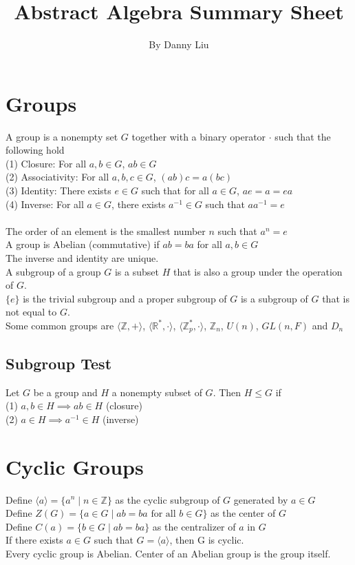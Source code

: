 \documentclass{article}
\title{Abstract Algebra Summary Sheet}
\author{By Danny Liu}
\date{}
\begin{document}
\maketitle

\section{Groups}
A group is a nonempty set $G$ together with a binary operator $\cdot$ such that the following hold \\
(1) Closure: For all $a, b \in G$, $ab \in G$ \\
(2) Associativity: For all $a, b, c \in G$, $(ab)c = a(bc)$ \\
(3) Identity: There exists $e \in G$ such that for all $a \in G$, $ae = a = ea$ \\
(4) Inverse: For all $a \in G$, there exists $a^{-1} \in G$ such that $aa^{-1} = e$ \\ \\
The order of an element is the smallest number $n$ such that $a^n = e$ \\
A group is Abelian (commutative) if $ab = ba$ for all $a, b \in G$ \\
The inverse and identity are unique. \\
A subgroup of a group $G$ is a subset $H$ that is also a group under the operation of $G$. \\
$\{e\}$ is the trivial subgroup and a proper subgroup of $G$ is a subgroup of $G$ that is not equal to $G$. \\
Some common groups are $\langle \mathbb{Z}, +\rangle$, $\langle \mathbb{R^*}, \cdot \rangle$, $\langle \mathbb{Z}_p^*, \cdot \rangle$, $\mathbb{Z}_n$, $U(n)$, $GL(n, F)$ and $D_n$
\subsection{Subgroup Test}
Let $G$ be a group and $H$ a nonempty subset of $G$. Then $H \leq G$ if \\
(1) $a, b \in H \implies ab \in H$ (closure) \\
(2) $a \in H \implies a^{-1} \in H$ (inverse) 


\section{Cyclic Groups}
Define $\langle a\rangle = \{a^{n} \mid n \in \mathbb{Z}\}$ as the cyclic subgroup of $G$ generated by $a \in G$ \\
Define $Z(G) = \{a \in G \mid ab = ba \text{ for all } b \in G\}$ as the center of $G$ \\
Define $C(a) = \{b \in G \mid ab = ba\}$ as the centralizer of $a$ in $G$ \\
If there exists $a \in G$ such that $G = \langle a\rangle$, then G is cyclic. \\
Every cyclic group is Abelian. Center of an Abelian group is the group itself. 
\end{document}
